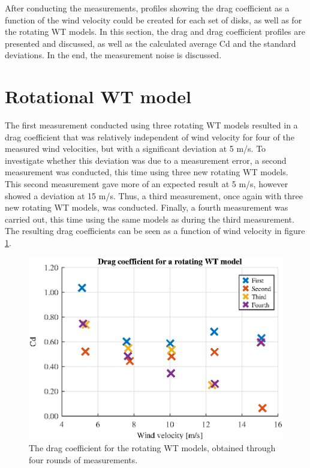After conducting the measurements, profiles showing the drag coefficient as a function of the wind velocity could be created for each set of disks, as well as for the rotating WT models. In this section, the drag and drag coefficient profiles are presented and discussed, as well as the calculated average Cd and the standard deviations. In the end, the measurement noise is discussed. 




\section{Rotational WT model}

The first measurement conducted using three rotating WT models resulted in a drag coefficient that was relatively independent of wind velocity for four of the measured wind velocities, but with a significant deviation at 5 m/s. To investigate whether this deviation was due to a measurement error, a second measurement was conducted, this time using three new rotating WT models. This second measurement gave more of an expected result at 5 m/s, however showed a deviation at 15 m/s. Thus, a third measurement, once again with three new rotating WT models, was conducted. Finally, a fourth measurement was carried out, this time using the same models as during the third measurement. The resulting drag coefficients can be seen as a function of wind velocity in figure \ref{fig:RotationalCD}.

\begin{figure}[h!]
    \centering
    \includegraphics[width=\linewidth]{0_Images/RotationalCD.eps}
    \caption{The drag coefficient for the rotating WT models, obtained through four rounds of measurements.}
    \label{fig:RotationalCD}
\end{figure}

